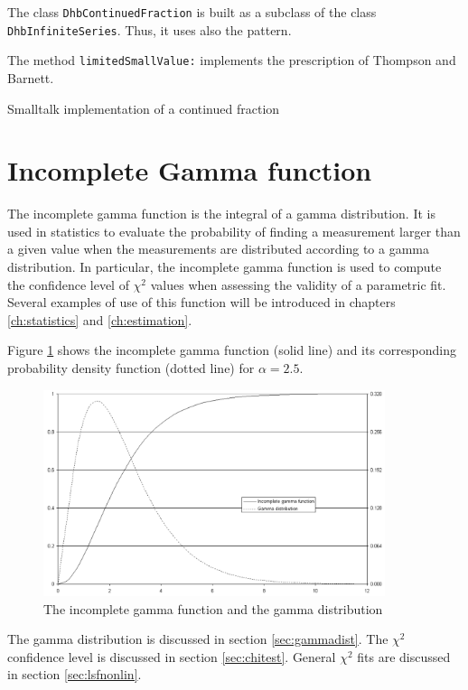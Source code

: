\documentclass[twoside]{book}
\begin{document}
The class {\tt DhbContinuedFraction} is built as a subclass of the
class {\tt DhbInfiniteSeries}. Thus, it uses also the
 pattern.

The method {\tt limitedSmallValue:} implements the prescription of
Thompson and Barnett.
\begin{listing} Smalltalk implementation of a continued fraction \label{ls:contfractions}

\end{listing}

\section{Incomplete Gamma function}
\label{sec:incGamma} The incomplete gamma function is the integral
of a gamma distribution. It is used in statistics to evaluate the
probability of finding a measurement larger than a given value
when the measurements are distributed according to a gamma
distribution. In particular, the incomplete gamma function is used
to compute the confidence level of $\chi^2$ values when assessing
the validity of a parametric fit. Several examples of use of this
function will be introduced in chapters \ref{ch:statistics} and
\ref{ch:estimation}.

Figure \ref{fig:incGamma} shows the incomplete gamma function
(solid line) and its corresponding probability density function
(dotted line) for $\alpha=2.5$.
\begin{figure}
\centering\includegraphics[width=10cm]{Figures/IncompleteGammaFunction}
\caption{The incomplete gamma function and the gamma distribution}\label{fig:incGamma}
\end{figure}

The gamma distribution is discussed in section
\ref{sec:gammadist}. The $\chi^2$ confidence level is discussed in
section \ref{sec:chitest}. General $\chi^2$ fits are discussed in
section \ref{sec:lsfnonlin}.
\end{document}
